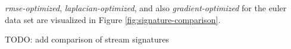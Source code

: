 \emph{rmse-optimized}, \emph{laplacian-optimized}, and also \emph{gradient-optimized} for the euler
data set are visualized in Figure \ref{fig:signature-comparison}. 

TODO: add comparison of stream signatures

